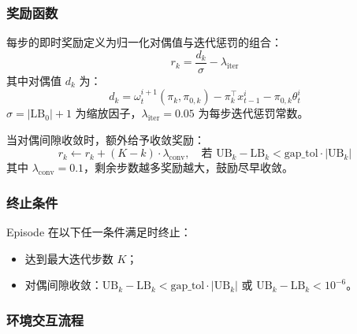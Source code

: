 \documentclass[11pt]{ctexart}
\begin{document}
\subsubsection{奖励函数}

每步的即时奖励定义为归一化对偶值与迭代惩罚的组合：
\begin{equation}
r_k = \frac{d_k}{\sigma} - \lambda_{\text{iter}}
\end{equation}
其中对偶值 $d_k$ 为：
\begin{equation}
d_k = \omega_t^{i+1}(\pi_k, \pi_{0,k}) - \pi_k^\top x_{t-1}^i - \pi_{0,k} \theta_t^i
\end{equation}
$\sigma = |\mathrm{LB}_0| + 1$ 为缩放因子，$\lambda_{\text{iter}} = 0.05$ 为每步迭代惩罚常数。

当对偶间隙收敛时，额外给予收敛奖励：
\begin{equation}
r_k \leftarrow r_k + (K - k) \cdot \lambda_{\text{conv}}, \quad \text{若 } \mathrm{UB}_k - \mathrm{LB}_k < \text{gap\_tol} \cdot |\mathrm{UB}_k|
\end{equation}
其中 $\lambda_{\text{conv}} = 0.1$，剩余步数越多奖励越大，鼓励尽早收敛。

\subsubsection{终止条件}

Episode 在以下任一条件满足时终止：
\begin{itemize}[itemsep=2pt, topsep=2pt]
    \item 达到最大迭代步数 $K$；
    \item 对偶间隙收敛：$\mathrm{UB}_k - \mathrm{LB}_k < \text{gap\_tol} \cdot |\mathrm{UB}_k|$ 或 $\mathrm{UB}_k - \mathrm{LB}_k < 10^{-6}$。
\end{itemize}

\subsubsection{环境交互流程}
\end{document}
